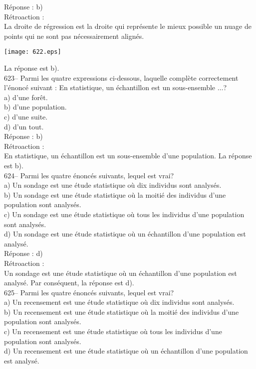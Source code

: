 ﻿\documentclass[letterpaper, 12pt]{article}
\begin{document}
R\'eponse : b)\\

R\'etroaction : \\
La droite de r\'egression est la droite qui repr\'esente le mieux
possible un nuage de points qui ne sont pas n\'ecessairement
align\'es.   \begin{center}
    \texttt{[image: 622.eps]}
    \end{center}  La r\'eponse
est b).\\


623-- Parmi les quatre expressions ci-dessous, laquelle compl\`ete
correctement l'\'enonc\'e suivant : \og En statistique, un
\'echantillon est un sous-ensemble $\ldots$\fg ?\\
a) d'une for\^et.\\
b) d'une population.\\
c) d'une suite.\\
d) d'un tout.\\

R\'eponse : b)\\

R\'etroaction : \\
En statistique, un \'echantillon est un sous-ensemble d'une population.  La
r\'eponse est b).\\

624-- Parmi les quatre \'enonc\'es suivants, lequel est vrai?\\
a) Un sondage est une \'etude statistique o\`u dix individus sont
analys\'es.\\
b) Un sondage est une \'etude statistique o\`u la moiti\'e des individus
d'une population sont analys\'es.\\
c) Un sondage est une \'etude statistique o\`u tous les individus d'une
population sont analys\'es.\\
d) Un sondage est une \'etude statistique o\`u un \'echantillon d'une
population est analys\'e.\\

R\'eponse : d)\\

R\'etroaction : \\
Un sondage est une \'etude statistique o\`u un \'echantillon d'une
population est analys\'e.  Par cons\'equent, la r\'eponse est d).\\

625-- Parmi les quatre \'enonc\'es suivants, lequel est vrai?\\
a) Un recensement est une \'etude statistique o\`u dix individus sont
analys\'es.\\
b) Un recensement est une \'etude statistique o\`u la moiti\'e des individus
d'une population sont analys\'es.\\
c) Un recensement est une \'etude statistique o\`u tous les individus d'une
population sont analys\'es.\\
d) Un recensement est une \'etude statistique o\`u un \'echantillon d'une
population est analys\'e.\\
\end{document}
